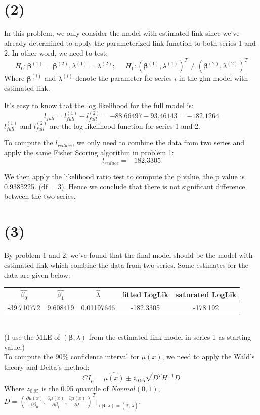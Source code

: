 \documentclass[12pt]{article}
\begin{document}
\section*{(2)}
In this problem, we only consider the model with estimated link since we've already determined to apply the parameterized link function to both series 1 and 2. In other word, we need to test:
$$H_0: \pmb{\beta}^{(1)}=\pmb{\beta}^{(2)}, \lambda^{(1)}=\lambda^{(2)}; \ \ \ \ \ \  H_1: (\pmb{\beta}^{(1)},\lambda^{(1)})^{T} \neq (\pmb{\beta}^{(2)},\lambda^{(2)})^{T}$$ 
Where $\pmb{\beta}^{(i)}$ and $\lambda^{(i)}$ denote the parameter for series $i$ in the glm model with estimated link.

It's easy to know that the log likelihood for the full model is:
$$l_{full}= l_{full}^{(1)}+ l_{full}^{(2)} = -88.66497 -93.46143 = -182.1264$$
$l_{full}^{(1)}$ and $l_{full}^{(2)}$ are the log likelihood function for series 1 and 2.

To compute the $l_{reduce}$, we only need to combine the data from two series and apply the same Fisher Scoring algorithm in problem 1:
$$l_{reduce}=-182.3305$$

We then apply the likelihood ratio test to compute the p value, the p value is 0.9385225. (df = 3).
Hence we conclude that there is not significant difference between the two series.


\section*{(3)}
By problem 1 and 2, we've found that the final model should be the model with estimated link which combine the data from two series.  Some estimates for the data are given below:\\

\begin{tabular}{|c|c|c|c|c|}
\hline
 $\hat{\beta_0}$ & $\hat{\beta_1}$ & $\hat{\lambda}$ & fitted LogLik & saturated LogLik\\
 \hline
-39.710772 & 9.608419 & 0.01197646  & -182.3305 & -178.192\\
\hline
\end{tabular}
\\

(I use the MLE of $(\pmb{\beta},\lambda)$ from the estimated link model in series 1 as starting value.)\\

To compute the $90\%$ confidence interval for $\mu(x)$, we need to apply the Wald's theory and Delta's method:
$$CI_{\mu} = \hat{\mu(x)} \pm z_{0.95} \sqrt{D^{T}H^{-1}D}$$
Where $z_{0.95}$ is the 0.95 quantile of $Normal(0,1)$, $D=(\frac{\partial \mu(x)}{\partial \beta_0},\frac{\partial \mu(x)}{\partial \beta_1},\frac{\partial \mu(x)}{\partial \lambda})^{T}|_{(\pmb{\beta},\lambda)=(\pmb{\hat{\beta}},\hat{\lambda})}$.
\end{document}
